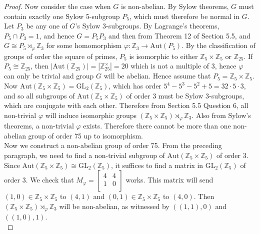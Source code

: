 \documentclass{article}
\begin{document}
\begin{enumerate}[label={\bf Q\arabic*:}]
\begin{proof}
      Now consider the case when $G$ is non-abelian. By Sylow theorems, $G$
      must contain exactly one Sylow 5-subgroup $P_5$, which must therefore
      be normal in $G$. Let $P_3$ be any one of $G$'s Sylow 3-subgroups. By
      Lagrange's theorems, $P_5\cap P_3=1$, and hence $G=P_5P_3$ and then
      from Theorem 12 of Section 5.5, and $G\cong
      P_5\rtimes_{\varphi}\mathbb{Z}_3$ for some homomorphism
      $\varphi:\mathbb{Z}_3\rightarrow\text{Aut}(P_5)$. By the
      classification of groups of order the square of primes, $P_5$ is
      isomorphic to either $\mathbb{Z}_5\times\mathbb{Z}_5$ or
      $\mathbb{Z}_{25}$. If $P_5\cong\mathbb{Z}_{25}$, then
      $|\text{Aut}(\mathbb{Z}_{25})|=|\mathbb{Z}_{25}^\times|=20$ which is
      not a multiple of 3, hence $\varphi$ can only be trivial and group
      $G$ will be abelian. Hence assume that
      $P_5=\mathbb{Z}_5\times\mathbb{Z}_5$. Now
      $\text{Aut}(\mathbb{Z}_5\times\mathbb{Z}_5)=\text{GL}_2(\mathbb{Z}_5)$,
      which has order $5^4-5^3-5^2+5=32\cdot5\cdot3$, and so all subgroups
      of $\text{Aut}(\mathbb{Z}_5\times\mathbb{Z}_5)$ of order 3 must be
      Sylow 3-subgroups, which are conjugate with each other. Therefore
      from Section 5.5 Question 6, all non-trivial $\varphi$ will induce
      isomorphic groups
      $(\mathbb{Z}_5\times\mathbb{Z}_5)\rtimes_{\varphi}\mathbb{Z}_3$.
      Also from Sylow's theorems, a non-trivial $\varphi$ exists. Therefore
      there cannot be more than one non-abelian group of order 75 up to
      isomorphism. \\

      Now we construct a non-abelian group of order 75. From the preceding
      paragraph, we need to find a non-trivial subgroup of 
      $\text{Aut}(\mathbb{Z}_5\times\mathbb{Z}_5)$ of order 3. Since
      $\text{Aut}(\mathbb{Z}_5\times\mathbb{Z}_5)\cong\text{GL}_2(\mathbb{Z}_5)$,
      it suffices to find a matrix in $\text{GL}_2(\mathbb{Z}_5)$ of order
      3. We check that $M_\varphi=\begin{bmatrix}4&4\\1&0\\\end{bmatrix}$ works.
      This matrix will send $(1,0)\in\mathbb{Z}_5\times\mathbb{Z}_5$ to
      $(4,1)$ and $(0,1)\in\mathbb{Z}_5\times\mathbb{Z}_5$ to $(4,0)$. Then
      $(\mathbb{Z}_5\times\mathbb{Z}_5)\rtimes_{\varphi}\mathbb{Z}_3$ will
      be non-abelian, as witnessed by $((1,1),0)$ and $((1,0),1)$. \\


\end{proof}
\end{enumerate}
\end{document}
